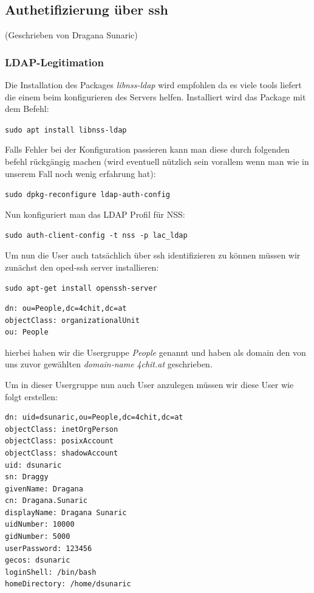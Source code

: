 \subsection{Authetifizierung über ssh}
(Geschrieben von Dragana Sunaric)

\subsubsection{LDAP-Legitimation}
Die Installation des Packages \textit{libnss-ldap} wird empfohlen da es viele tools liefert die einem beim konfigurieren des Servers helfen. Installiert wird das Package mit dem Befehl:

\verb|sudo apt install libnss-ldap|

Falls Fehler bei der Konfiguration passieren kann man diese durch folgenden befehl rückgängig machen (wird eventuell nützlich sein vorallem wenn man wie in unserem Fall noch wenig erfahrung hat):

\verb|sudo dpkg-reconfigure ldap-auth-config|

Nun konfiguriert man das LDAP Profil für NSS:

\verb|sudo auth-client-config -t nss -p lac_ldap|


Um nun die User auch tatsächlich über ssh identifizieren zu können müssen wir zunächst den oped-ssh server installieren:

\verb|sudo apt-get install openssh-server|



\begin{lstlisting}[caption=Usergruppe hinzufügen]
dn: ou=People,dc=4chit,dc=at
objectClass: organizationalUnit
ou: People
\end{lstlisting}

hierbei haben wir die Usergruppe \textit{People} genannt und haben als domain den von uns zuvor gewählten \textit{domain-name}  \textit{4chit.at} geschrieben.

Um in dieser Usergruppe nun auch User anzulegen müssen wir diese User wie folgt erstellen:

\begin{lstlisting}[caption=User hinzufügen]
dn: uid=dsunaric,ou=People,dc=4chit,dc=at
objectClass: inetOrgPerson
objectClass: posixAccount
objectClass: shadowAccount
uid: dsunaric
sn: Draggy
givenName: Dragana
cn: Dragana.Sunaric
displayName: Dragana Sunaric
uidNumber: 10000
gidNumber: 5000
userPassword: 123456
gecos: dsunaric
loginShell: /bin/bash
homeDirectory: /home/dsunaric
\end{lstlisting}

